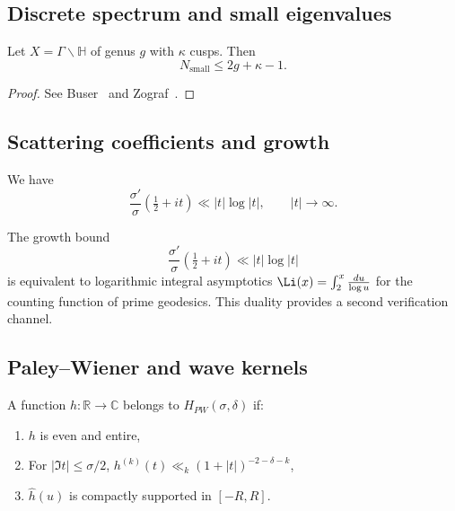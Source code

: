 \subsection{Discrete spectrum and small eigenvalues}

\begin{proposition}
\label{prop:small}
Let $X=\Gamma\backslash\mathbb{H}$ of genus $g$ with $\kappa$ cusps. Then
\[
N_{\mathrm{small}} \leq 2g+\kappa-1.
\]
\end{proposition}

\begin{proof}
See Buser~\cite{Buser1992} and Zograf~\cite{Zograf1987}.
\end{proof}

\subsection{Scattering coefficients and growth}

\begin{lemma}
\label{lem:sigma-growth}
We have
\[
\frac{\sigma'}{\sigma}\!\left(\tfrac12+it\right)\ll |t|\log|t|,
\qquad |t|\to\infty.
\]
\end{lemma}

\begin{remark}
The growth bound
\[
\frac{\sigma'}{\sigma}\!\left(\tfrac12+it\right)\ll |t|\log|t|
\]
is equivalent to logarithmic integral asymptotics 
$\Li(x)=\int_2^x \frac{du}{\log u}$ 
for the counting function of prime geodesics. 
This duality provides a second verification channel.
\end{remark}

\subsection{Paley–Wiener and wave kernels}

\begin{definition}
\label{def:PW}
A function $h:\mathbb{R}\to\mathbb{C}$ belongs to $H_{PW}(\sigma,\delta)$ if:
\begin{enumerate}
\item $h$ is even and entire,
\item For $|\Im t|\leq \sigma/2$, $h^{(k)}(t)\ll_k (1+|t|)^{-2-\delta-k}$,
\item $\widehat{h}(u)$ is compactly supported in $[-R,R]$.
\end{enumerate}
\end{definition}

